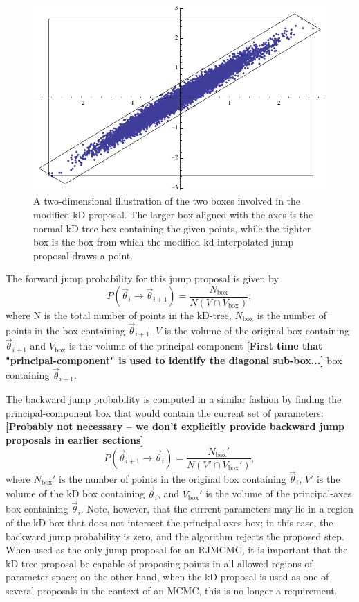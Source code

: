 \documentclass{iopart}
\newcommand{\vtheta}{\vec{\theta}}
\newcommand{\Nbox}{N_\mathrm{box}}
\newcommand{\Vbox}{V_\mathrm{box}}
\newcommand{\ee}{\end{equation}}
\newcommand{\bel}[1]{\begin{equation}\label{#1}}
\newcommand{\ilya}[1]{{\color{red} \bf #1}}
\begin{document}
\begin{figure}
  \includegraphics[width=0.8\columnwidth]{PCC}
  \caption{\label{fig:PCC} A two-dimensional illustration of the two
    boxes involved in the modified kD proposal.  The larger box
    aligned with the axes is the normal kD-tree box containing the
    given points, while the tighter box is the box from which the
    modified kd-interpolated jump proposal draws a point. }
\end{figure}

The forward jump probability for this jump proposal is given by
%
\bel{modforward} P(\vtheta_i \rightarrow \vtheta_{i+1}) =
\frac{\Nbox}{N \left(V \cap \Vbox \right)} , \ee
%
where N is the total number of points in the kD-tree, $\Nbox$ is the
number of points in the box containing $\vtheta_{i+1}$, $V$ is the
volume of the original box containing $\vtheta_{i+1}$ and $\Vbox$ is
the volume of the principal-component \ilya{[First time that "principal-component" is used to identify the diagonal sub-box...]} box containing $\vtheta_{i+1}$.

The backward jump probability is computed in a similar fashion by
finding the principal-component box that would contain the current set
of parameters: \ilya{[Probably not necessary -- we don't explicitly provide backward jump proposals in earlier sections]}
%
\bel{modbackward} P(\vtheta_{i+1} \rightarrow \vtheta_{i}) =
\frac{\Nbox'}{N\left(V' \cap \Vbox'\right)} , \ee
%
where $\Nbox'$ is the number of points in the original box containing
$\vtheta_i$, $V'$ is the volume of the kD box containing $\vtheta_i$,
and $\Vbox'$ is the volume of the principal-axes box containing
$\vtheta_i$.  Note, however, that the current parameters may lie in a
region of the kD box that does not intersect the principal axes box;
in this case, the backward jump probability is zero, and the algorithm
rejects the proposed step.  When used as the only jump proposal for an
RJMCMC, it is important that the kD tree proposal be capable of
proposing points in all allowed regions of parameter space; on the
other hand, when the kD proposal is used as one of several proposals
in the context of an MCMC, this is no longer a requirement.
\end{document}
